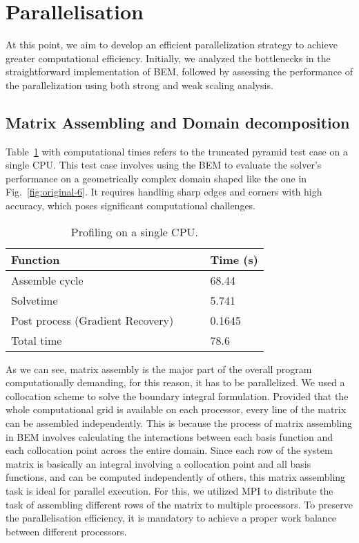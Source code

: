 
\section{Parallelisation}
\label{sec:Parallelisation}

At this point, we aim to develop an efficient parallelization strategy to achieve greater computational efficiency. Initially, we analyzed the bottlenecks in the straightforward implementation of BEM, followed by assessing the performance of the parallelization using both strong and weak scaling analysis.

\subsection{Matrix Assembling and Domain decomposition}
\label{sub:matrix_assembling}

Table~\ref{tb:truncated-py} with computational times refers to the truncated pyramid test case on a single CPU. This test case involves using the BEM to evaluate the solver's performance on a geometrically complex domain shaped like the one in Fig.~\ref{fig:original-6}. It requires handling sharp edges and corners with high accuracy, which poses significant computational challenges.

\begin{table}[hb]
\begin{center}
\caption{Profiling on a single CPU.}\label{tb:truncated-py}
\vspace{-0.5em}
\begin{tabular}{ll}
\hline
Function & Time (s) \\
\hline
Assemble cycle & 68.44 \\
Solvetime & 5.741 \\
Post process (Gradient Recovery) $\qquad$ & 0.1645 \\
Total time & 78.6 \\ 
\hline
\end{tabular}
\end{center}
\end{table}

As we can see, matrix assembly is the major part of the overall program computationally demanding, for this reason, it has to be parallelized. We used a collocation scheme to solve the boundary integral formulation. Provided that the whole computational grid is available on each processor, every line of the matrix can be assembled independently. This is because the process of matrix assembling in BEM involves calculating the interactions
between each basis function and each collocation point across the entire domain. Since each row of the system matrix is basically an integral involving a collocation point and all basis functions, and can be computed independently of others, this matrix assembling task is ideal for parallel execution. For this, we utilized MPI to distribute the task of assembling different rows of the matrix to multiple processors. To preserve the parallelisation efficiency, it is mandatory to achieve a proper work balance between different processors.

